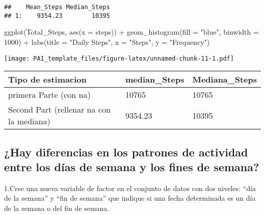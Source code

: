 \documentclass[
]{article}
\newenvironment{Shaded}{\begin{snugshade}}{\end{snugshade}}
\newcommand{\AttributeTok}[1]{\textcolor[rgb]{0.77,0.63,0.00}{#1}}
\newcommand{\DecValTok}[1]{\textcolor[rgb]{0.00,0.00,0.81}{#1}}
\newcommand{\FunctionTok}[1]{\textcolor[rgb]{0.00,0.00,0.00}{#1}}
\newcommand{\NormalTok}[1]{#1}
\newcommand{\SpecialCharTok}[1]{\textcolor[rgb]{0.00,0.00,0.00}{#1}}
\newcommand{\StringTok}[1]{\textcolor[rgb]{0.31,0.60,0.02}{#1}}
\begin{document}
\begin{verbatim}
##    Mean_Steps Median_Steps
## 1:    9354.23        10395
\end{verbatim}

\begin{Shaded}
\begin{Highlighting}[]
\FunctionTok{ggplot}\NormalTok{(Total\_Steps, }\FunctionTok{aes}\NormalTok{(}\AttributeTok{x =}\NormalTok{ steps)) }\SpecialCharTok{+} \FunctionTok{geom\_histogram}\NormalTok{(}\AttributeTok{fill =} \StringTok{"blue"}\NormalTok{, }\AttributeTok{binwidth =} \DecValTok{1000}\NormalTok{) }\SpecialCharTok{+} \FunctionTok{labs}\NormalTok{(}\AttributeTok{title =} \StringTok{"Daily Steps"}\NormalTok{, }\AttributeTok{x =} \StringTok{"Steps"}\NormalTok{, }\AttributeTok{y =} \StringTok{"Frequency"}\NormalTok{)}
\end{Highlighting}
\end{Shaded}

\texttt{[image: PA1\_template\_files/figure-latex/unnamed-chunk-11-1.pdf]}

\begin{longtable}[]{@{}lll@{}}
\toprule
Tipo de estimacion & median\_Steps & Mediana\_Steps \\
\midrule
\endhead
primera Parte (con na) & 10765 & 10765 \\
Second Part (rellenar na con la mediana) & 9354.23 & 10395 \\
\bottomrule
\end{longtable}

\hypertarget{hay-diferencias-en-los-patrones-de-actividad-entre-los-duxedas-de-semana-y-los-fines-de-semana}{%
\subsection{¿Hay diferencias en los patrones de actividad entre los días
de semana y los fines de
semana?}\label{hay-diferencias-en-los-patrones-de-actividad-entre-los-duxedas-de-semana-y-los-fines-de-semana}}

1.Cree una nueva variable de factor en el conjunto de datos con dos
niveles: ``día de la semana'' y ``fin de semana'' que indique si una
fecha determinada es un día de la semana o del fin de semana.
\end{document}
